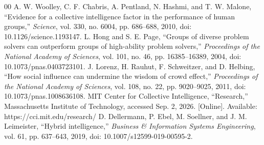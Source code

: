 \documentclass[conference]{IEEEtran}
\begin{document}
\balance
\begin{thebibliography}{00}
 A. W. Woolley, C. F. Chabris, A. Pentland, N. Hashmi, and T. W. Malone, ``Evidence for a collective intelligence factor in the performance of human groups,'' \textit{Science}, vol. 330, no. 6004, pp. 686--688, 2010, doi: 10.1126/science.1193147.
 L. Hong and S. E. Page, ``Groups of diverse problem solvers can outperform groups of high-ability problem solvers,'' \textit{Proceedings of the National Academy of Sciences}, vol. 101, no. 46, pp. 16385--16389, 2004, doi: 10.1073/pnas.0403723101.
 J. Lorenz, H. Rauhut, F. Schweitzer, and D. Helbing, ``How social influence can undermine the wisdom of crowd effect,'' \textit{Proceedings of the National Academy of Sciences}, vol. 108, no. 22, pp. 9020--9025, 2011, doi: 10.1073/pnas.1008636108.
 MIT Center for Collective Intelligence, ``Research,'' Massachusetts Institute of Technology, accessed Sep. 2, 2026. [Online]. Available: https://cci.mit.edu/research/
 D. Dellermann, P. Ebel, M. Soellner, and J. M. Leimeister, ``Hybrid intelligence,'' \textit{Business \& Information Systems Engineering}, vol. 61, pp. 637--643, 2019, doi: 10.1007/s12599-019-00595-2.
\end{thebibliography}
\end{document}
